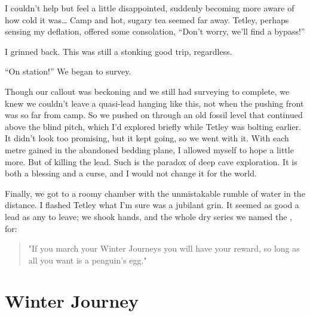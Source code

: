 I couldn't help but feel a little disappointed, suddenly becoming more
aware of how cold it was\ldots{} Camp  and hot, sugary tea
seemed far away. Tetley, perhaps sensing my deflation, offered some
consolation, ``Don't worry, we'll find a bypass!''

I grinned back. This was still a stonking good trip, regardless.

``On station!'' We began to survey.



Though our callout was beckoning and we still had surveying to complete,
we knew we couldn't leave a quasi-lead hanging like this, not when the
pushing front was so far from camp. So we pushed on through an old
fossil level that continued above the blind pitch, which I'd explored
briefly while Tetley was bolting earlier. It didn't look too promising,
but it kept going, so we went with it. With each metre gained in the
abandoned bedding plane, I allowed myself to hope a little more. But  of killing
the lead. Such is the paradox of deep cave exploration. It is both a
blessing and a curse, and I would not change it for the world.

Finally, we got to a roomy chamber with the unmistakable rumble of water
in the distance. I flashed Tetley what I'm sure was a jubilant grin. It
seemed as good a lead as any to leave; we shook hands, and the whole dry
series we named the , for:

\begin{quote}"If you march your Winter Journeys you will have your reward, so long as all you want is a penguin’s egg." \end{quote}


\newpage
\section{Winter Journey}

